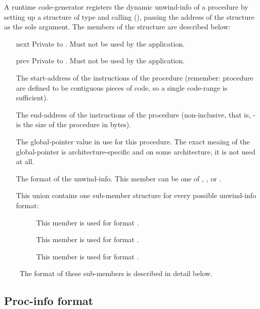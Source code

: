 \documentclass{article}
\begin{document}
A runtime code-generator registers the dynamic unwind-info of a
procedure by setting up a structure of type 
and calling (), passing the address of the
structure as the sole argument.  The members of the
 structure are described below:
\begin{itemize}
\item[\Type{void~*}next] Private to .  Must not be used
  by the application.
\item[\Type{void~*}prev] Private to .  Must not be used
  by the application.
\item[\Type{unw\_word\_t} \Var{start\_ip}] The start-address of the
  instructions of the procedure (remember: procedure are defined to be
  contiguous pieces of code, so a single code-range is sufficient).
\item[\Type{unw\_word\_t} \Var{end\_ip}] The end-address of the
  instructions of the procedure (non-inclusive, that is,
  - is the size of the procedure in
  bytes).
\item[\Type{unw\_word\_t} \Var{gp}] The global-pointer value in use
  for this procedure.  The exact meaing of the global-pointer is
  architecture-specific and on some architecture, it is not used at
  all.
\item[\Type{int32\_t} \Var{format}] The format of the unwind-info.
  This member can be one of ,
  , or
  .
\item[\Type{union} \Var{u}] This union contains one sub-member
  structure for every possible unwind-info format:
  \begin{description}
  \item[ ] This member is used
    for format .
  \item[ ] This member is used
    for format .
  \item[ ] This member
    is used for format .
  \end{description}\
  The format of these sub-members is described in detail below.
\end{itemize}

\subsection{Proc-info format}
\end{document}
